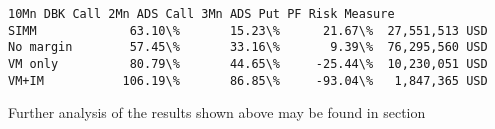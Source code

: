             \begin{tcolorbox}[breakable, size=fbox, boxrule=.5pt, pad at break*=1mm, opacityfill=0]
\begin{Verbatim}[commandchars=\\\{\}]
          10Mn DBK Call 2Mn ADS Call 3Mn ADS Put PF Risk Measure
SIMM             63.10\%       15.23\%      21.67\%  27,551,513 USD
No margin        57.45\%       33.16\%       9.39\%  76,295,560 USD
VM only          80.79\%       44.65\%     -25.44\%  10,230,051 USD
VM+IM           106.19\%       86.85\%     -93.04\%   1,847,365 USD
\end{Verbatim}
\end{tcolorbox}
        
    Further analysis of the results shown above may be found in section


